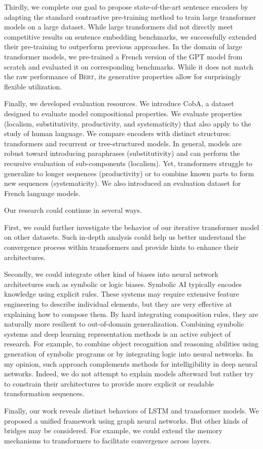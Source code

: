 Thirdly, we complete our goal to propose state-of-the-art sentence encoders by adapting the standard contrastive pre-training method to train large transformer models on a large dataset. While large transformers did not directly meet competitive results on sentence embedding benchmarks, we successfully extended their pre-training to outperform previous approaches. In the domain of large transformer models, we pre-trained a French version of the GPT model from scratch and evaluated it on corresponding benchmarks. While it does not match the raw performance of \textsc{Bert}, its generative properties allow for surprisingly flexible utilization.

Finally, we developed evaluation resources. We introduce CobA, a dataset designed to evaluate model compositional properties. We evaluate properties (localism, substitutivity, productivity, and systematicity) that also apply to the study of human language. We compare encoders with distinct structures: transformers and recurrent or tree-structured models. In general, models are robust toward introducing paraphrases (substitutivity) and can perform the recursive evaluation of sub-components (localism). Yet, transformers struggle to generalize to longer sequences (productivity) or to combine known parts to form new sequences (systematicity). We also introduced an evaluation dataset for French language models.

Our research could continue in several ways. 

First, we could further investigate the behavior of our iterative transformer model on other datasets. Such in-depth analysis could help us better understand the convergence process within transformers and provide hints to enhance their architectures. 

Secondly, we could integrate other kind of biases into neural network architectures such as symbolic or logic biases. Symbolic AI typically encodes knowledge using explicit rules. These systems may require extensive feature engineering to describe individual elements, but they are very effective at explaining how to compose them. By hard integrating composition rules, they are naturally more resilient to out-of-domain generalization. Combining symbolic systems and deep learning representation methods is an active subject of research. For example, to combine object recognition and reasoning abilities using generation of symbolic programs or by integrating logic into neural networks. In my opinion, such approach complements methods for intelligibility in deep neural networks. Indeed, we do not attempt to explain models afterward but rather try to constrain their architectures to provide more explicit or readable transformation sequences. 

Finally, our work reveals distinct behaviors of LSTM and transformer models. We proposed a unified framework using graph neural networks. But other kinds of bridges may be considered. For example, we could extend the memory mechanisms to transformers to facilitate convergence across layers.
